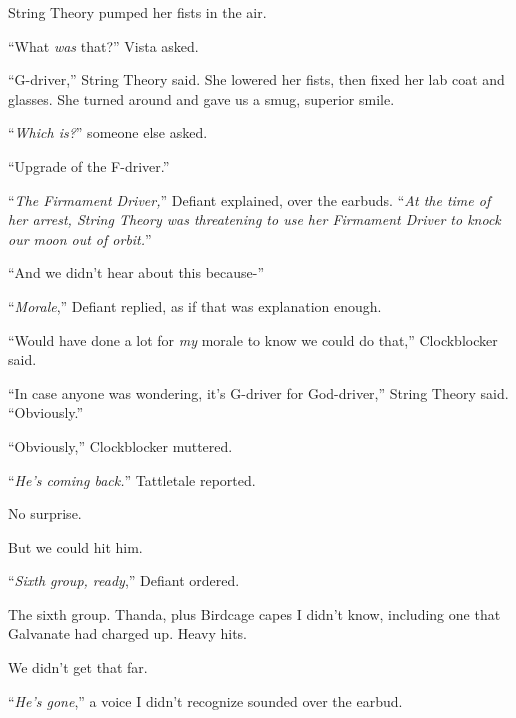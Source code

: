 String Theory pumped her fists in the air.



``What \emph{was} that?'' Vista asked.



``G-driver,'' String Theory said.  She lowered her fists, then fixed her lab coat and glasses.  She turned around and gave us a smug, superior smile.



``\emph{Which is?}'' someone else asked.



``Upgrade of the F-driver.''



``\emph{The Firmament Driver,}'' Defiant explained, over the earbuds.  ``\emph{At the time of her arrest, String Theory was threatening to use her Firmament Driver to knock our moon out of orbit.}''



``And we didn't hear about this because-''



``\emph{Morale},'' Defiant replied, as if that was explanation enough.



``Would have done a lot for \emph{my} morale to know we could do that,'' Clockblocker said.



``In case anyone was wondering, it's G-driver for God-driver,'' String Theory said.  ``Obviously.''



``Obviously,'' Clockblocker muttered.



``\emph{He's coming back.}'' Tattletale reported.



No surprise.



But we could hit him.



``\emph{Sixth group, ready},'' Defiant ordered.



The sixth group.  Thanda, plus Birdcage capes I didn't know, including one that Galvanate had charged up.  Heavy hits.



We didn't get that far.



``\emph{He's gone},'' a voice I didn't recognize sounded over the earbud.



